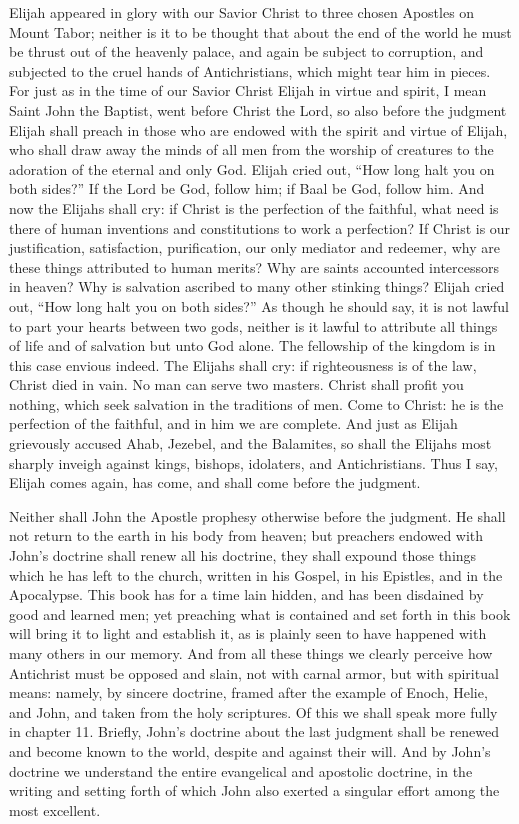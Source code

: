 Elijah appeared in glory with our Savior Christ to three chosen Apostles on Mount Tabor; neither is it to be thought that about the end of the world he must be thrust out of the heavenly palace, and again be subject to corruption, and subjected to the cruel hands of Antichristians, which might tear him in pieces. For just as in the time of our Savior Christ Elijah in virtue and spirit, I mean Saint John the Baptist, went before Christ the Lord, so also before the judgment Elijah shall preach in those who are endowed with the spirit and virtue of Elijah, who shall draw away the minds of all men from the worship of creatures to the adoration of the eternal and only God. Elijah cried out, “How long halt you on both sides?” If the Lord be God, follow him; if Baal be God, follow him. And now the Elijahs shall cry: if Christ is the perfection of the faithful, what need is there of human inventions and constitutions to work a perfection? If Christ is our justification, satisfaction, purification, our only mediator and redeemer, why are these things attributed to human merits? Why are saints accounted intercessors in heaven? Why is salvation ascribed to many other stinking things? Elijah cried out, “How long halt you on both sides?” As though he should say, it is not lawful to part your hearts between two gods, neither is it lawful to attribute all things of life and of salvation but unto God alone. The fellowship of the kingdom is in this case envious indeed. The Elijahs shall cry: if righteousness is of the law, Christ died in vain. No man can serve two masters. Christ shall profit you nothing, which seek salvation in the traditions of men. Come to Christ: he is the perfection of the faithful, and in him we are complete. And just as Elijah grievously accused Ahab, Jezebel, and the Balamites, so shall the Elijahs most sharply inveigh against kings, bishops, idolaters, and Antichristians. Thus I say, Elijah comes again, has come, and shall come before the judgment.

Neither shall John the Apostle prophesy otherwise before the judgment. He shall not return to the earth in his body from heaven; but preachers endowed with John’s doctrine shall renew all his doctrine, they shall expound those things which he has left to the church, written in his Gospel, in his Epistles, and in the Apocalypse. This book has for a time lain hidden, and has been disdained by good and learned men; yet preaching what is contained and set forth in this book will bring it to light and establish it, as is plainly seen to have happened with many others in our memory. And from all these things we clearly perceive how Antichrist must be opposed and slain, not with carnal armor, but with spiritual means: namely, by sincere doctrine, framed after the example of Enoch, Helie, and John, and taken from the holy scriptures. Of this we shall speak more fully in chapter 11. Briefly, John’s doctrine about the last judgment shall be renewed and become known to the world, despite and against their will. And by John’s doctrine we understand the entire evangelical and apostolic doctrine, in the writing and setting forth of which John also exerted a singular effort among the most excellent.

